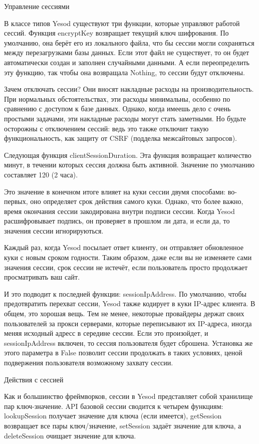 Управление сессиями

В классе типов Yesod существуют три функции, которые управляют работой сессий. Функция encryptKey возвращает текущий ключ шифрования. По умолчанию, она берёт его из локального файла, что бы сессии могли сохраняться между перезагрузками базы данных. Если этот файл не существует, то он будет автоматически создан и заполнен случайными данными. А если переопределить эту функцию, так чтобы она возвращала Nothing, то сессии будут отключены.

Зачем отключать сессии? Они вносят накладные расходы на производительность. При нормальных обстоятельствах, эти расходы минимальны, особенно по сравнению с доступом к базе данных. Однако, когда имеешь дело с очень простыми задачами, эти накладные расходы могут стать заметными. Но будьте осторожны с отключением сессий: ведь это также отключит такую функциональность, как защиту от CSRF (подделка межсайтовых запросов).

Следующая функция clientSessionDuration. Эта функция возвращает количество минут, в течении которых сессия должна быть активной. Значение по умолчанию составляет 120 (2 часа).

Это значение в конечном итоге влияет на куки сессии двумя способами: во-первых, оно определяет срок действия самого куки. Однако, что более важно, время окончания сессии закодирована внутри подписи сессии. Когда Yesod расшифровывает подпись, он проверяет в прошлом ли дата, и если да, то значения сессии игнорируються.

Каждый раз, когда Yesod посылает ответ клиенту, он отправляет обновленное куки с новым сроком годности. Таким образом, даже если вы не изменяете сами значения сессии, срок сессии не истечёт, если пользователь просто продолжает просматривать ваш сайт.

И это подводит к последней функции: sessionIpAddress. По умолчанию, чтобы предотвратить перехват сессии, Yesod также кодирует в куки IP-адрес клиента. В общем, это хорошая вещь. Тем не менее, некоторые провайдеры держат своих пользователей за прокси серверами, которые переписывают их IP-адреса, иногда меняя исходный адресс в середине сессии. Если это произойдет, и sessionIpAddress включен, то сессия пользователя будет сброшена. Установка же этого параметра в False позволит сессии продолжать в таких условиях, ценой подвержения пользователя возможному захвату сессии.

Действия с сессией

Как и большинство фреймворков, сессии в Yesod представляет собой хранилище пар ключ-значение. API базовой сессии сводится к четырем функциям: lookupSession получает значение для ключа (если имеется), getSession возвращает все пары ключ/значение, setSession задаёт значение для ключа, а deleteSession очищает значение для ключа.

